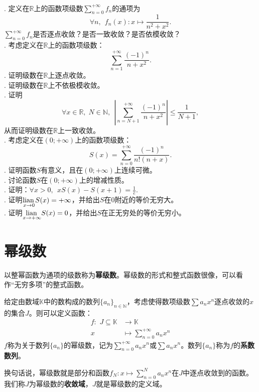 \documentclass[12pt,UTF8,fontset=none]{ctexbook}
\begin{document}
\begin{appendix}
\begin{so}
\end{so}

\begin{xt}
    \mbox{} \\
    . 定义在$\mathbb{R}$上的函数项级数$\sum_{n=0}^{+\infty} f_n$的通项为
    $$ \forall n, \;\, f_n(x): x \mapsto \frac{1}{n^2 + x^2}.$$
    \indent $\sum_{n=0}^{+\infty} f_n$是否逐点收敛？是否一致收敛？是否依模收敛？\\ 
    . 考虑定义在$\mathbb{R}$上的函数项级数：
    $$\sum_{n=1}^{+\infty} \frac{(-1)^n}{n + x^2}.$$
    . 证明级数在$\mathbb{R}$上逐点收敛。\\
    . 证明级数在$\mathbb{R}$上不依极模收敛。\\
    . 证明
    $$\forall x\in\mathbb{R},\; N\in\mathbb{N},\;\,\left|\sum_{n=N+1}^{+\infty} \frac{(-1)^n}{n + x^2}\right| \leqslant \frac{1}{N+1},$$
    \indent 从而证明级数在$\mathbb{R}$上一致收敛。\\
    . 考虑定义在$(0;+\infty)$上的函数项级数：
    $$S(x) = \sum_{n=0}^{+\infty} \frac{(-1)^n}{n!(n + x)}.$$
    . 证明函数$S$有意义，且在$(0;+\infty)$上连续可微。\\
    . 讨论函数$S$在$(0;+\infty)$上的增减性质。\\
    . 证明：$\forall x > 0,\;\, xS(x) - S(x + 1) = \frac{1}{e}.$ \\
    . 证明$\underset{x\to 0}{\operatorname{lian}\,} S(x) = +\infty$，并给出$S$在$0$附近的等价无穷大。\\
    . 证明$\underset{x\to +\infty}{\operatorname{lian}\,} S(x) = 0$，并给出$S$在正无穷处的等价无穷小。\\
\end{xt}

\chapter{幂级数}

以整幂函数为通项的级数称为\textbf{幂级数}。幂级数的形式和整式函数很像，可以看作“无穷多项”的整式函数。
\begin{df}
    给定由数域$\mathbb{K}$中的数构成的数列$\{a_n\}_{n\in\mathbb{N}}$，考虑使得数项级数$\sum a_n x^n$逐点收敛的$x$的集合$J$。则可以定义函数：
    $$
    \begin{array}{rl}
        f: \,\, J\subseteq \mathbb{K} &\rightarrow \mathbb{K} \\
        x &\displaystyle \mapsto \sum_{n=0}^{+\infty} a_n x^n        
    \end{array}
    $$
    $f$称为关于数列$\{a_n\}$的幂级数，记为$\sum_{n=0}^{+\infty} a_n x^n$或$\sum a_n x^n$。数列$\{a_n\}$称为$f$的\textbf{系数数列}。
\end{df}
换句话说，幂级数就是部分和函数$f_N : x\mapsto \sum_{n=0}^{N} a_n x^n$在$J$中逐点收敛到的函数。
我们称$J$为幂级数的\textbf{收敛域}，$J$就是幂级数的定义域。


\end{appendix}
\end{document}
